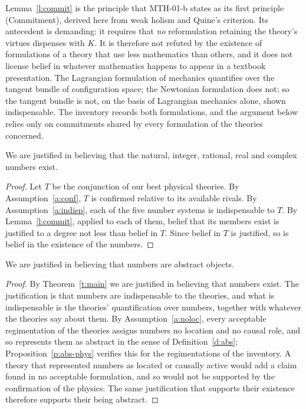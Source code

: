 \documentclass{situationist-preprint}
\begin{document}
Lemma~\ref{l:commit} is the principle that MTH-01-b states as its first principle (Commitment), derived here from weak holism and Quine's criterion. Its antecedent is demanding: it requires that \emph{no} reformulation retaining the theory's virtues dispenses with $K$. It is therefore not refuted by the existence of formulations of a theory that use less mathematics than others, and it does not license belief in whatever mathematics happens to appear in a textbook presentation. The Lagrangian formulation of mechanics quantifies over the tangent bundle of configuration space; the Newtonian formulation does not; so the tangent bundle is not, on the basis of Lagrangian mechanics alone, shown indispensable. The inventory records both formulations, and the argument below relies only on commitments shared by every formulation of the theories concerned.

\begin{theorem}\label{t:main}
We are justified in believing that the natural, integer, rational, real and complex numbers exist.
\end{theorem}

\begin{proof}
Let $T$ be the conjunction of our best physical theories. By Assumption~\ref{a:conf}, $T$ is confirmed relative to its available rivals. By Assumption~\ref{a:indisp}, each of the five number systems is indispensable to $T$. By Lemma~\ref{l:commit}, applied to each of them, belief that its members exist is justified to a degree not less than belief in $T$. Since belief in $T$ is justified, so is belief in the existence of the numbers.
\end{proof}

\begin{proposition}[Abstractness]\label{p:abstract}
We are justified in believing that numbers are abstract objects.
\end{proposition}

\begin{proof}
By Theorem~\ref{t:main} we are justified in believing that numbers exist. The justification is that numbers are indispensable to the theories, and what is indispensable is the theories' quantification over numbers, together with whatever the theories say about them. By Assumption~\ref{a:noloc}, every acceptable regimentation of the theories assigns numbers no location and no causal role, and so represents them as abstract in the sense of Definition~\ref{d:abs}; Proposition~\ref{p:abs-phys} verifies this for the regimentations of the inventory. A theory that represented numbers as located or causally active would add a claim found in no acceptable formulation, and so would not be supported by the confirmation of the physics. The same justification that supports their existence therefore supports their being abstract.
\end{proof}
\end{document}
